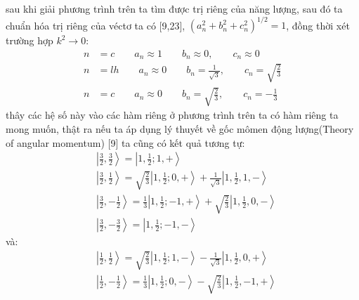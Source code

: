 sau khi giải phương trình trên ta tìm được trị riêng của năng lượng, sau đó ta chuẩn hóa trị riêng của véctơ ta có [9,23], $(a_n^2+b_n^2 +c_n^2)^{1/2}=1$, đồng thời xét trường hợp  $k^2\rightarrow 0$:
\begin{align*}
n&=c \qquad a_n\approx 1 \qquad b_n\approx 0, \qquad c_n\approx 0 \\
n&=lh \qquad a_n\approx 0 \qquad b_n = \frac{1}{\sqrt{3}}, \qquad c_n = \sqrt{\frac{2}{3}} \\
n&=c \qquad a_n\approx 0 \qquad b_n =  \sqrt{\frac{2}{3}}, \qquad c_n = -\frac{1}{3} 
\end{align*}
thây các hệ số này vào các hàm riêng ở phương trình trên ta có hàm riêng ta mong muốn, thật ra nếu ta áp dụng lý thuyết về gốc mômen động lượng(Theory of angular momentum) [9] ta cũng có kết quả tương tự:
\begin{align*}
&\left |\frac{3}{2},\frac{3}{2}\right\rangle =\left |1,\frac{1}{2};1,+\right\rangle \\
&\left |\frac{3}{2},\frac{1}{2}\right\rangle =\sqrt{\frac{2}{3}}\left |1,\frac{1}{2};0,+\right\rangle +\frac{1}{\sqrt{3}}\left |1,\frac{1}{2},1,-\right\rangle \\
&\left |\frac{3}{2},-\frac{1}{2}\right\rangle = \frac{1}{3}\left |1,\frac{1}{2};-1,+\right\rangle +\sqrt{\frac{2}{3}}\left |1,\frac{1}{2},0,- \right\rangle \\
&\left |\frac{3}{2},-\frac{3}{2}\right\rangle = \left |1,\frac{1}{2};-1,-\right\rangle
 \end{align*}
 và:
 \begin{align*}
&\left |\frac{1}{2},\frac{1}{2}\right\rangle = \sqrt{\frac{2}{3}}\left |1,\frac{1}{2};1,-\right\rangle -\frac{1}{\sqrt{3}}\left |1,\frac{1}{2},0,+\right\rangle \\
&\left |\frac{1}{2},-\frac{1}{2}\right\rangle = \frac{1}{3}\left |1,\frac{1}{2};0,-\right\rangle -\sqrt{\frac{2}{3}}\left |1,\frac{1}{2},-1,+\right\rangle 
\end{align*}  
